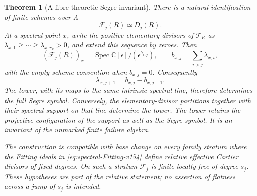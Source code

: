 \documentclass[11pt,reqno]{amsart}
\numberwithin{equation}{section}
\newtheorem{theorem}{Theorem}[section]
\theoremstyle{definition}\newtheorem{definition}[theorem]{Definition}
\theoremstyle{remark}\newtheorem{remark}[theorem]{Remark}
\newcommand{\C}{\mathbb C}\newcommand{\Q}{\mathbb Q}
\DeclareMathOperator{\Spec}{Spec}\DeclareMathOperator{\PGL}{PGL}
\begin{document}
\begin{theorem}[A fibre-theoretic Segre invariant]\label{thm:spectral-fibres-v154}
There is a natural identification of finite schemes over $\Lambda$
\begin{equation}\label{eq:fibre-divisor-v154}
                        \mathcal F_j(R)\simeq D_j(R).
\end{equation}
At a spectral point $x$, write the positive elementary divisors of
$\mathcal T_R$ as
$\lambda_{x,1}\geq\cdots\geq\lambda_{x,r_x}>0$, and extend this
sequence by zeroes. Then
\begin{equation}\label{eq:fibre-length-v154}
 (\mathcal F_j(R))_x=\Spec\C[\epsilon]/(\epsilon^{b_{x,j}}),
 \qquad b_{x,j}=\sum_{i>j}\lambda_{x,i},
\end{equation}
with the empty-scheme convention when $b_{x,j}=0$. Consequently
\begin{equation}\label{eq:Segre-difference-v154}
                 \lambda_{x,j+1}=b_{x,j}-b_{x,j+1}.
\end{equation}
The tower, with its maps to the same intrinsic spectral line,
therefore determines the full Segre symbol. Conversely, the
elementary-divisor partitions together with their spectral support
on that line determine the tower. The tower retains the projective
configuration of the support as well as the Segre symbol.
It is an invariant of the unmarked finite failure algebra.

The construction is compatible with base change on every family
stratum where the Fitting ideals in \eqref{eq:spectral-Fitting-v154}
define relative effective Cartier divisors of fixed degrees. On such
a stratum $\mathcal F_j$ is finite locally free of degree $s_j$.
These hypotheses are part of the relative statement; no assertion of
flatness across a jump of $s_j$ is intended.
\end{theorem}
\end{document}
